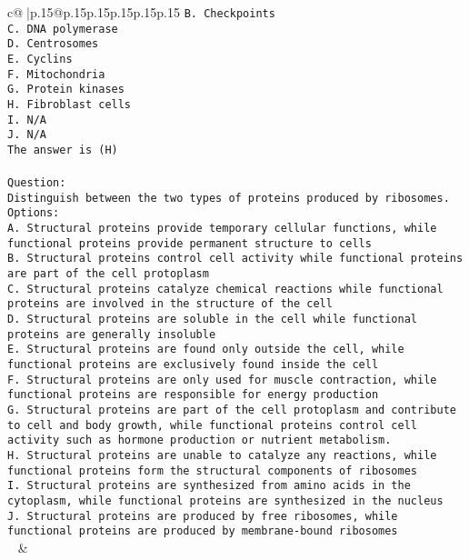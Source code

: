 \documentclass{article}
\begin{document}
{\begin{supertabular}{c@{$\;$}|p{.15\linewidth}@{}p{.15\linewidth}p{.15\linewidth}p{.15\linewidth}p{.15\linewidth}p{.15\linewidth}}
{{{\tt B. Checkpoints\\ \tt C. DNA polymerase\\ \tt D. Centrosomes\\ \tt E. Cyclins\\ \tt F. Mitochondria\\ \tt G. Protein kinases\\ \tt H. Fibroblast cells\\ \tt I. N/A\\ \tt J. N/A\\ \tt The answer is (H)\\ \tt \\ \tt Question:\\ \tt Distinguish between the two types of proteins produced by ribosomes.\\ \tt Options:\\ \tt A. Structural proteins provide temporary cellular functions, while functional proteins provide permanent structure to cells\\ \tt B. Structural proteins control cell activity while functional proteins are part of the cell protoplasm\\ \tt C. Structural proteins catalyze chemical reactions while functional proteins are involved in the structure of the cell\\ \tt D. Structural proteins are soluble in the cell while functional proteins are generally insoluble\\ \tt E. Structural proteins are found only outside the cell, while functional proteins are exclusively found inside the cell\\ \tt F. Structural proteins are only used for muscle contraction, while functional proteins are responsible for energy production\\ \tt G. Structural proteins are part of the cell protoplasm and contribute to cell and body growth, while functional proteins control cell activity such as hormone production or nutrient metabolism.\\ \tt H. Structural proteins are unable to catalyze any reactions, while functional proteins form the structural components of ribosomes\\ \tt I. Structural proteins are synthesized from amino acids in the cytoplasm, while functional proteins are synthesized in the nucleus\\ \tt J. Structural proteins are produced by free ribosomes, while functional proteins are produced by membrane-bound ribosomes\\ \tt  
	  } 
	   } 
	   } 
	 & \\ 
 


\end{supertabular}}
\end{document}
